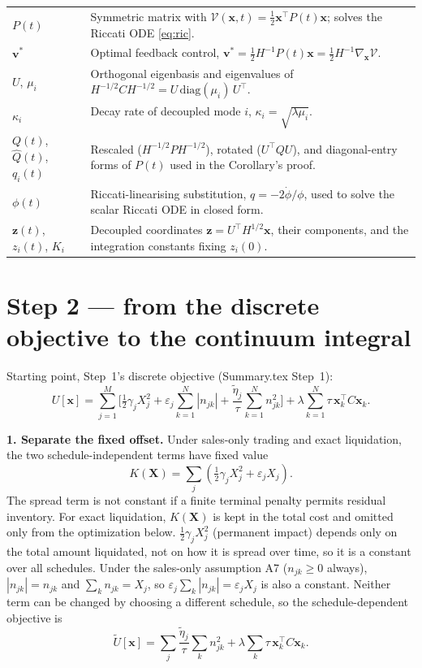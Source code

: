 \documentclass[11pt,a4paper]{article}
\begin{document}
\begin{center}
\begin{tabular}{@{}L{2.1cm}L{12.5cm}@{}}
$P(t)$ & Symmetric matrix with $\mathcal V(\mathbf x,t)=\tfrac12\mathbf x^\top P(t)\mathbf x$; solves the Riccati ODE \eqref{eq:ric}. \\
$\mathbf v^*$ & Optimal feedback control, $\mathbf v^*=\tfrac12H^{-1}P(t)\mathbf x=\tfrac12H^{-1}\nabla_{\mathbf x}\mathcal V$. \\
$U$, $\mu_i$ & Orthogonal eigenbasis and eigenvalues of $H^{-1/2}CH^{-1/2}=U\,\mathrm{diag}(\mu_i)\,U^\top$. \\
$\kappa_i$ & Decay rate of decoupled mode $i$, $\kappa_i=\sqrt{\lambda\mu_i}$. \\
$Q(t)$, $\hat Q(t)$, $q_i(t)$ & Rescaled ($H^{-1/2}PH^{-1/2}$), rotated ($U^\top QU$), and diagonal-entry forms of $P(t)$ used in the Corollary's proof. \\
$\phi(t)$ & Riccati-linearising substitution, $q=-2\dot\phi/\phi$, used to solve the scalar Riccati ODE in closed form. \\
$\mathbf z(t)$, $z_i(t)$, $K_i$ & Decoupled coordinates $\mathbf z=U^\top H^{1/2}\mathbf x$, their components, and the integration constants fixing $z_i(0)$. \\
\bottomrule
\end{tabular}
\end{center}

\section*{Step 2 --- from the discrete objective to the continuum integral}

Starting point, Step~1's discrete objective (Summary.tex Step~1):
\begin{equation}
U[\mathbf x]=\sum_{j=1}^{M}\Big[\tfrac12\gamma_jX_j^2+\varepsilon_j\sum_{k=1}^N
|n_{jk}|+\frac{\tilde\eta_j}{\tau}\sum_{k=1}^N n_{jk}^2\Big]+\lambda\sum_{k=1}^N
\tau\,\mathbf x_k^\top C\mathbf x_k .
\label{eq:s1}
\end{equation}

\textbf{1. Separate the fixed offset.} Under sales-only trading and exact
liquidation, the two schedule-independent terms have fixed value
\[
K(\mathbf X)=\sum_j\left(\tfrac12\gamma_jX_j^2+\varepsilon_jX_j\right).
\]
The spread term is not constant if a finite terminal penalty permits residual
inventory. For exact liquidation, $K(\mathbf X)$ is kept in the total cost and
omitted only from the optimization below. $\tfrac12\gamma_jX_j^2$
(permanent impact) depends only on the total amount liquidated, not on how it
is spread over time, so it is a constant over all schedules. Under the
sales-only assumption A7 ($n_{jk}\ge0$ always), $|n_{jk}|=n_{jk}$ and
$\sum_kn_{jk}=X_j$, so $\varepsilon_j\sum_k|n_{jk}|=\varepsilon_jX_j$ is also a
constant. Neither term can be changed by choosing a different schedule, so
the schedule-dependent objective is
\[
\tilde U[\mathbf x]=\sum_{j}\frac{\tilde\eta_j}{\tau}\sum_kn_{jk}^2
+\lambda\sum_k\tau\,\mathbf x_k^\top C\mathbf x_k .
\]
\end{document}
